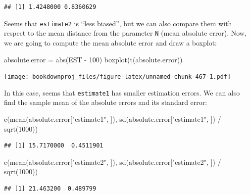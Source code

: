 \documentclass[
]{book}
\newenvironment{Shaded}{\begin{snugshade}}{\end{snugshade}}
\newcommand{\DecValTok}[1]{\textcolor[rgb]{0.00,0.00,0.81}{#1}}
\newcommand{\FunctionTok}[1]{\textcolor[rgb]{0.00,0.00,0.00}{#1}}
\newcommand{\NormalTok}[1]{#1}
\newcommand{\OtherTok}[1]{\textcolor[rgb]{0.56,0.35,0.01}{#1}}
\newcommand{\SpecialCharTok}[1]{\textcolor[rgb]{0.00,0.00,0.00}{#1}}
\newcommand{\StringTok}[1]{\textcolor[rgb]{0.31,0.60,0.02}{#1}}
\begin{document}
\begin{verbatim}
## [1] 1.4248000 0.8360629
\end{verbatim}

Seems that \texttt{estimate2} is ``less biased'', but we can also compare them with respect to the mean distance from the parameter \texttt{N} (mean absolute error). Now, we are going to compute the mean absolute error and draw a boxplot:

\begin{Shaded}
\begin{Highlighting}[]
\NormalTok{absolute.error }\OtherTok{=} \FunctionTok{abs}\NormalTok{(EST }\SpecialCharTok{{-}} \DecValTok{100}\NormalTok{)}
\FunctionTok{boxplot}\NormalTok{(}\FunctionTok{t}\NormalTok{(absolute.error))}
\end{Highlighting}
\end{Shaded}

\texttt{[image: bookdownproj\_files/figure-latex/unnamed-chunk-467-1.pdf]}

In this case, seems that \texttt{estimate1} has smaller estimation errors. We can also find the sample mean of the absolute errors and its standard error:

\begin{Shaded}
\begin{Highlighting}[]
\FunctionTok{c}\NormalTok{(}\FunctionTok{mean}\NormalTok{(absolute.error[}\StringTok{"estimate1"}\NormalTok{, ]), }\FunctionTok{sd}\NormalTok{(absolute.error[}\StringTok{"estimate1"}\NormalTok{, ]) }\SpecialCharTok{/} \FunctionTok{sqrt}\NormalTok{(}\DecValTok{1000}\NormalTok{))}
\end{Highlighting}
\end{Shaded}

\begin{verbatim}
## [1] 15.7170000  0.4511901
\end{verbatim}

\begin{Shaded}
\begin{Highlighting}[]
\FunctionTok{c}\NormalTok{(}\FunctionTok{mean}\NormalTok{(absolute.error[}\StringTok{"estimate2"}\NormalTok{, ]), }\FunctionTok{sd}\NormalTok{(absolute.error[}\StringTok{"estimate2"}\NormalTok{, ]) }\SpecialCharTok{/} \FunctionTok{sqrt}\NormalTok{(}\DecValTok{1000}\NormalTok{))}
\end{Highlighting}
\end{Shaded}

\begin{verbatim}
## [1] 21.463200  0.489799
\end{verbatim}
\end{document}
